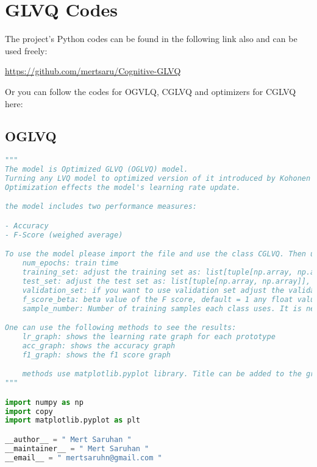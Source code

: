 \chapter{GLVQ Codes}
\noindent The project's Python codes can be found in the following link also and can be used freely:

\noindent \url{https://github.com/mertsaru/Cognitive-GLVQ}
\vspace{10pt}

\noindent Or you can follow the codes for OGVLQ, CGLVQ and optimizers for CGLVQ here:

\section*{\hypertarget{appoglvq}{OGLVQ}}
\begin{lstlisting}[language = python]
"""
The model is Optimized GLVQ (OGLVQ) model.
Turning any LVQ model to optimized version of it introduced by Kohonen (1995, pp. 175-189) in "Self-Orgazing Maps" (DOI:https://doi.org/10.1007/978-3-642-97610-0), please refer to the paper when needed.
Optimization effects the model's learning rate update.

the model includes two performance measures:

- Accuracy
- F-Score (weighed average)

To use the model please import the file and use the class CGLVQ. Then use class method train with the following parameters:
    num_epochs: train time
    training_set: adjust the training set as: list[tuple[np.array, np.array]],
    test_set: adjust the test set as: list[tuple[np.array, np.array]],
    validation_set: if you want to use validation set adjust the validation set as: list[tuple[np.array, np.array]] = None,
    f_score_beta: beta value of the F score, default = 1 any float value can be used,
    sample_number: Number of training samples each class uses. It is needed to calculate the weighted F scores

One can use the following methods to see the results:
    lr_graph: shows the learning rate graph for each prototype
    acc_graph: shows the accuracy graph
    f1_graph: shows the f1 score graph

    methods use matplotlib.pyplot library. Title can be added to the graphs as string by adding the title in the method as parameter.
"""

import numpy as np
import copy
import matplotlib.pyplot as plt

__author__ = " Mert Saruhan "
__maintainer__ = " Mert Saruhan "
__email__ = " mertsaruhn@gmail.com "



\end{lstlisting}
